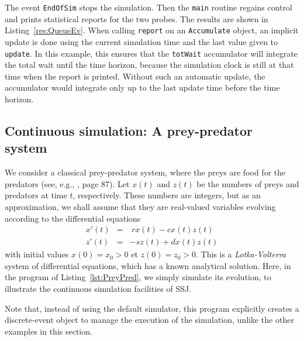 The event \texttt{EndOfSim} stops the simulation.
Then the \texttt{main} routine regains control and prints statistical
reports for the two probes.
The results are shown in Listing~\ref{res:QueueEv}.
When calling \texttt{report} on an \texttt{Accumulate} object, an implicit
update is done using the current simulation time and the last
value given to \texttt{update}.  In this example, this ensures
that the \texttt{totWait} accumulator will integrate the total wait
until the time horizon, because the simulation clock is still at that
time when the report is printed.
Without such an automatic update, the accumulator would integrate
only up to the last update time before the time horizon.






\subsection {Continuous simulation: A prey-predator system}
\label {sec:preypred}

We consider a classical prey-predator system, where the preys
are food for the predators (see, e.g., \cite{sLAW00a}, page 87).
Let $x(t)$ and $z(t)$ be the numbers of preys and predators
at time $t$, respectively.
These numbers are integers, but as an approximation,
we shall assume that they are real-valued variables evolving
according to the differential equations
\begin{eqnarray*}
  x'(t) &= &\ r x(t) - c x(t) z(t)\\
  z'(t) &= & -s z(t) + d x(t) z(t)
\end{eqnarray*}
with initial values $x(0)=x_0>0$ et $z(0)=z_0>0$.
This is a \emph{Lotka-Volterra} system of differential
equations, which has a known analytical solution.
Here, in the program of Listing~\ref{lst:PreyPred},
we simply simulate its evolution, to illustrate the continuous
simulation facilities of SSJ.



Note that, instead of using the default simulator, this program
explicitly  creates a discrete-event  object to manage the
execution of the simulation, unlike the other examples in this section.

